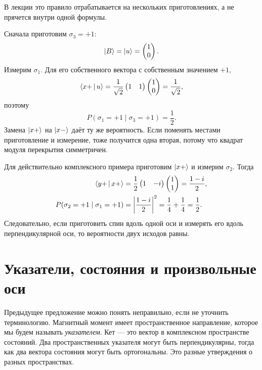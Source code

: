 В лекции это правило отрабатывается на нескольких приготовлениях, а не прячется внутри одной формулы.

Сначала приготовим \(\sigma_3=+1\):
\begin{equation}
  \left\lvert B\right\rangle=\left\lvert u\right\rangle=\begin{pmatrix}1\\0\end{pmatrix}.
\end{equation}
Измерим \(\sigma_1\). Для его собственного вектора с собственным значением \(+1\),
\begin{equation}
  \left\langle x+\,\middle|\,u\right\rangle
  =
  \frac{1}{\sqrt2}
  \begin{pmatrix}1&1\end{pmatrix}
  \begin{pmatrix}1\\0\end{pmatrix}
  =\frac{1}{\sqrt2},
\end{equation}
поэтому
\begin{equation}
  P(\sigma_1=+1\mid\sigma_3=+1)=\frac12.
\end{equation}
Замена \(\left\lvert x+\right\rangle\) на \(\left\lvert x-\right\rangle\) даёт ту же вероятность. Если поменять местами приготовление и измерение, тоже получится одна вторая, потому что квадрат модуля перекрытия симметричен.

Для действительно комплексного примера приготовим \(\left\lvert x+\right\rangle\) и измерим \(\sigma_2\). Тогда
\begin{align}
  \left\langle y+\,\middle|\,x+\right\rangle
  &=
  \frac12
  \begin{pmatrix}1&-i\end{pmatrix}
  \begin{pmatrix}1\\1\end{pmatrix}
  =\frac{1-i}{2},
  \notag\\
  P(\sigma_2=+1\mid\sigma_1=+1)
  &=\left|\frac{1-i}{2}\right|^2
  =\frac14+\frac14
  =\frac12.
  \label{eq:l03-complex-probability-example}
\end{align}
Следовательно, если приготовить спин вдоль одной оси и измерять его вдоль перпендикулярной оси, то вероятности двух исходов равны.

\section{Указатели, состояния и произвольные оси}

Предыдущее предложение можно понять неправильно, если не уточнить терминологию. Магнитный момент имеет пространственное направление, которое мы будем называть \emph{указателем}. Кет — это вектор в комплексном пространстве состояний. Два пространственных указателя могут быть перпендикулярны, тогда как два вектора состояния могут быть ортогональны. Это разные утверждения о разных пространствах.

